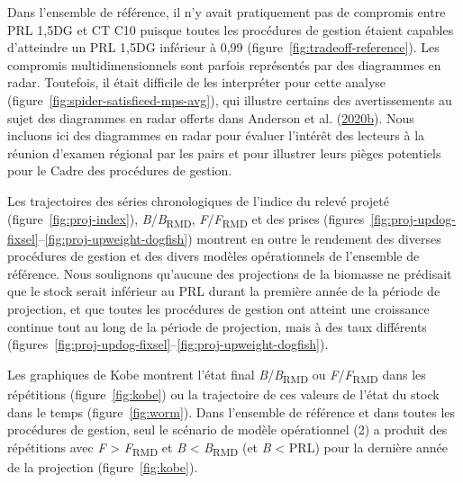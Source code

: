 \documentclass[french,11pt]{book}
\begin{document}
Dans l'ensemble de référence, il n'y avait pratiquement pas de compromis entre PRL 1,5DG et CT C10 puisque toutes les procédures de gestion étaient capables d'atteindre un PRL 1,5DG inférieur à 0,99 (figure~\ref{fig:tradeoff-reference}). Les compromis multidimensionnels sont parfois représentés par des diagrammes en radar. Toutefois, il était difficile de les interpréter pour cette analyse (figure~\ref{fig:spider-satisficed-mps-avg}), qui illustre certains des avertissements au sujet des diagrammes en radar offerts dans Anderson et al. (\protect\hyperlink{ref-anderson2020gfmp}{2020b}). Nous incluons ici des diagrammes en radar pour évaluer l'intérêt des lecteurs à la réunion d'examen régional par les pairs et pour illustrer leurs pièges potentiels pour le Cadre des procédures de gestion.

Les trajectoires des séries chronologiques de l'indice du relevé projeté (figure~\ref{fig:proj-index}), \emph{B}/\emph{B}\textsubscript{RMD}, \emph{F}/\emph{F}\textsubscript{RMD} et des prises (figures~\ref{fig:proj-updog-fixsel}--\ref{fig:proj-upweight-dogfish}) montrent en outre le rendement des diverses procédures de gestion et des divers modèles opérationnels de l'ensemble de référence. Nous soulignons qu'aucune des projections de la biomasse ne prédisait que le stock serait inférieur au PRL durant la première année de la période de projection, et que toutes les procédures de gestion ont atteint une croissance continue tout au long de la période de projection, mais à des taux différents (figures~\ref{fig:proj-updog-fixsel}--\ref{fig:proj-upweight-dogfish}).

Les graphiques de Kobe montrent l'état final \emph{B}/\emph{B}\textsubscript{RMD} ou \emph{F}/\emph{F}\textsubscript{RMD} dans les répétitions (figure~\ref{fig:kobe}) ou la trajectoire de ces valeurs de l'état du stock dans le temps (figure~\ref{fig:worm}). Dans l'ensemble de référence et dans toutes les procédures de gestion, seul le scénario de modèle opérationnel (2) a produit des répétitions avec \emph{F} \textgreater{} \emph{F}\textsubscript{RMD} et \emph{B} \textless{} \emph{B}\textsubscript{RMD} (et \emph{B} \textless{} PRL) pour la dernière année de la projection (figure~\ref{fig:kobe}).
\end{document}
